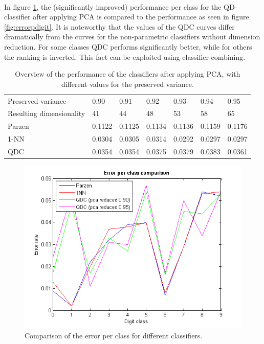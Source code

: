 \\
In figure \ref{fig:errorpdigit2}, the (significantly improved) performance per class for the QD-classifier after applying PCA is compared to the performance as seen in figure \ref{fig:errorpdigit}. It is noteworthy that the values of the QDC curves differ dramatically from the curves for the non-parametric classifiers without dimension reduction. For some classes QDC performs significantly better, while for others the ranking is inverted. This fact can be exploited using classifier combining.
\begin{table}[H]
	\centering
	\caption{Overview of the performance of the classifiers after applying PCA, with different values for the preserved variance.}
	\label{tab:PCA}
	\begin{tabular}{l|llllll}
		Preserved variance       & 0.90   & 0.91   & 0.92   & 0.93   & 0.94   & 0.95   \\
		Resulting dimensionality & 41     & 44     & 48     & 53     & 58     & 65     \\ \hline
		Parzen                   & 0.1122 & 0.1125 & 0.1134 & 0.1136 & 0.1159 & 0.1176 \\
		1-NN                     & 0.0304 & 0.0305 & 0.0314 & 0.0292 & 0.0297 & 0.0297 \\
		QDC                      & 0.0354 & 0.0354 & 0.0375 & 0.0379 & 0.0383 & 0.0361
	\end{tabular}
\end{table}
\begin{figure}[H]
	\centering
	\includegraphics[scale=0.8]{images/pr_figure_3.png}
	\caption{Comparison of the error per class for different classifiers.}
	\label{fig:errorpdigit2}
\end{figure}
